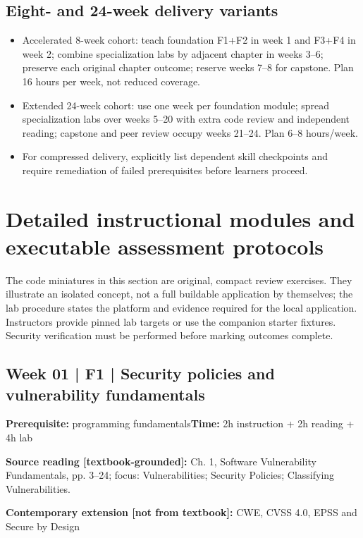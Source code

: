 \documentclass[10pt,letterpaper]{article}
\begin{document}
\subsection{Eight- and 24-week delivery variants}
\begin{itemize}[leftmargin=*,itemsep=2pt]
\item Accelerated 8-week cohort: teach foundation F1+F2 in week 1 and F3+F4 in week 2; combine specialization labs by adjacent chapter in weeks 3--6; preserve each original chapter outcome; reserve weeks 7--8 for capstone. Plan 16 hours per week, not reduced coverage.
\item Extended 24-week cohort: use one week per foundation module; spread specialization labs over weeks 5--20 with extra code review and independent reading; capstone and peer review occupy weeks 21--24. Plan 6--8 hours/week.
\item For compressed delivery, explicitly list dependent skill checkpoints and require remediation of failed prerequisites before learners proceed.
\end{itemize}
\section{Detailed instructional modules and executable assessment protocols}
The code miniatures in this section are original, compact review exercises. They illustrate an isolated concept, not a full buildable application by themselves; the lab procedure states the platform and evidence required for the local application. Instructors provide pinned lab targets or use the companion starter fixtures. Security verification must be performed before marking outcomes complete.

\subsection{Week 01 | F1 | Security policies and vulnerability fundamentals}
\textbf{Prerequisite:} programming fundamentals\hfill\textbf{Time:} 2h instruction + 2h reading + 4h lab

\textbf{Source reading [textbook-grounded]:} Ch. 1, Software Vulnerability Fundamentals, pp. 3--24; focus: Vulnerabilities; Security Policies; Classifying Vulnerabilities.

\textbf{Contemporary extension [not from textbook]:} CWE, CVSS 4.0, EPSS and Secure by Design
\end{document}
